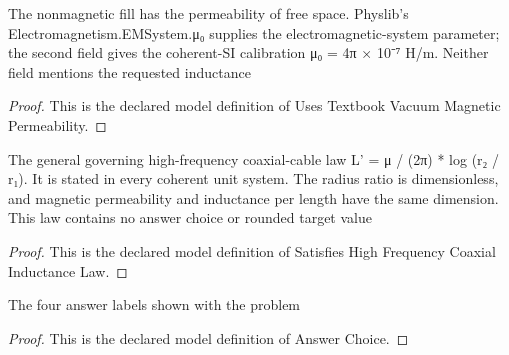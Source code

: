 \begin{definition}
  \label{def:physics:phyx-mini-0885:phyxminiproblems-problemphyxmini0885-usestextbookvacuummagneticpermeability}
  The nonmagnetic fill has the permeability of free space. Physlib's Electromagnetism.EMSystem.μ₀ supplies the electromagnetic-system parameter; the second field gives the coherent-SI calibration μ₀ = 4π × 10⁻⁷ H/m. Neither field mentions the requested inductance
\end{definition}
\begin{proof}
  This is the declared model definition of Uses Textbook Vacuum Magnetic Permeability.
\end{proof}
\begin{definition}
  \label{def:physics:phyx-mini-0885:phyxminiproblems-problemphyxmini0885-satisfieshighfrequencycoaxialinductancelaw}
  The general governing high-frequency coaxial-cable law L' = μ / (2π) * log (r₂ / r₁). It is stated in every coherent unit system. The radius ratio is dimensionless, and magnetic permeability and inductance per length have the same dimension. This law contains no answer choice or rounded target value
\end{definition}
\begin{proof}
  This is the declared model definition of Satisfies High Frequency Coaxial Inductance Law.
\end{proof}
\begin{definition}
  \label{def:physics:phyx-mini-0885:phyxminiproblems-problemphyxmini0885-answerchoice}
  The four answer labels shown with the problem
\end{definition}
\begin{proof}
  This is the declared model definition of Answer Choice.
\end{proof}
